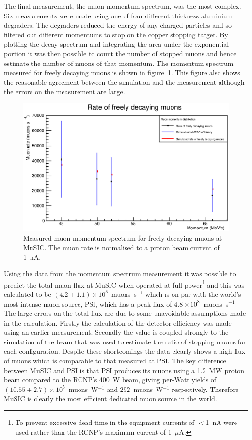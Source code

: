 The final measurement, the muon momentum spectrum, was the most complex. Six measurements were made using one of four different thickness aluminium degraders. The degraders reduced the energy of any charged particles and so filtered out different momentums to stop on the copper stopping target. By plotting the decay spectrum and integrating the area under the exponential portion it was then possible to count the number of stopped muons and hence estimate the number of muons of that momentum. The momentum spectrum measured for freely decaying muons is shown in figure~\ref{fig:exec_summary_muon_momentum_spectrum}. This figure also shows the reasonable agreement between the simulation and the measurement although the errors on the measurement are large. 

\begin{figure}[htpb]
  \centering
    \includegraphics[width=.9\textwidth]{../3_measurements/images/plot_generating_scripts/adjusted_muon_rates_exec_summary_version.eps}
  \caption{Measured muon momentum spectrum for freely decaying muons at MuSIC. The muon rate is normalised to a proton beam current of 1~nA.}
  \label{fig:exec_summary_muon_momentum_spectrum}
\end{figure}

Using the data from the momentum spectrum measurement it was possible to predict the total muon flux at MuSIC when operated at full power\footnote{To prevent excessive dead time in the equipment currents of \(<\)1~nA were used rather than the RCNP's maximum current of 1~\(\mu\)A.} and this was calculated to be \((4.2\pm1.1)\times10^8\)~muons~s\(^{-1}\) which is on par with the world's most intense muon source, PSI, which has a peak flux of \(4.8\times10^8\)~muons~s\(^{-1}\). The large errors on the total flux are due to some unavoidable assumptions made in the calculation. Firstly the calculation of the detector efficiency was made using an earlier measurement. Secondly the value is coupled strongly to the simulation of the beam that was used to estimate the ratio of stopping muons for each configuration. Despite these shortcomings the data clearly shows a high flux of muons which is comparable to that measured at PSI. The key difference between MuSIC and PSI is that PSI produces its muons using a 1.2~MW proton beam compared to the RCNP's 400~W beam, giving per-Watt yields of \((10.55\pm2.7)\times10^5\)~muons~W\(^{-1}\) and 292~muons~W\(^{-1}\) respectively. Therefore MuSIC is clearly the most efficient dedicated muon source in the world.

